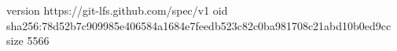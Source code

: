 version https://git-lfs.github.com/spec/v1
oid sha256:78d52b7c909985e406584a1684e7feedb523c82c0ba981708c21abd10b0ed9cc
size 5566
